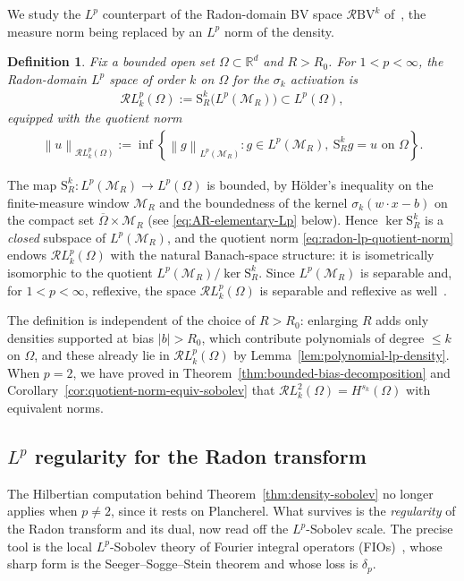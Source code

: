 \documentclass[12pt]{article}
\numberwithin{equation}{section}
\newtheorem{definition}{Definition}[section]
\numberwithin{figure}{section}
\numberwithin{equation}{section}
\newcommand{\R}{\mathbb{R}}
\newcommand{\MR}{\mathcal M_R}
\newcommand{\norm}[1]{\left\|#1\right\|}
\begin{document}
We study the $L^p$ counterpart of the Radon-domain
BV space $\mathcal{R}\mathrm{BV}^k$
of~\cite{parhi_banachspacerepresenter_2021,parhi_whatkindsfunctions_2022}, the
measure norm being replaced by an $L^p$ norm of the density.
\begin{definition}
\label{def:radon-lp-representation-space}
Fix a bounded open set $\Omega\subset\R^d$ and
$R>R_0$.  For $1<p<\infty$, the \emph{Radon-domain $L^p$
space of order $k$} on $\Omega$ for the $\sigma_k$ activation is
\begin{align*}
    \mathcal{R}L^p_k(\Omega)
    :=\mathrm{S}^k_R\bigl(L^p(\MR)\bigr)\subset L^p(\Omega),
\end{align*}
equipped with the quotient norm
\begin{align}
    \norm{u}_{\mathcal{R}L^p_k(\Omega)}
    :=\inf\left\{
    \norm{g}_{L^p(\MR)}:
    g\in L^p(\MR),\ \mathrm{S}^k_R g=u\text{ on }\Omega
    \right\}.
    \label{eq:radon-lp-quotient-norm}
\end{align}
\end{definition}
The map $\mathrm{S}^k_R:L^p(\MR)\to L^p(\Omega)$ is bounded, by H\"older's
inequality on the finite-measure window $\MR$ and the boundedness of the kernel
$\sigma_k(w\cdot x-b)$ on the compact set $\overline\Omega\times\MR$
(see \eqref{eq:AR-elementary-Lp} below).  Hence $\ker\mathrm{S}^k_R$ is a
\emph{closed} subspace of $L^p(\MR)$, and the quotient norm
\eqref{eq:radon-lp-quotient-norm} endows $\mathcal{R}L^p_k(\Omega)$ with the
natural Banach-space structure: it is isometrically isomorphic to the quotient
$L^p(\MR)/\ker\mathrm{S}^k_R$.  Since $L^p(\MR)$ is separable and, for
$1<p<\infty$, reflexive, the space $\mathcal{R}L^p_k(\Omega)$ is separable and
reflexive as well~\cite{lax2014functional}.

The definition is independent of the choice of $R>R_0$: enlarging $R$ adds only
densities supported at bias $|b|>R_0$, which contribute polynomials of degree
$\le k$ on $\Omega$, and these already lie in $\mathcal{R}L^p_k(\Omega)$ by
Lemma~\ref{lem:polynomial-lp-density}.  When $p=2$, we have proved in
Theorem~\ref{thm:bounded-bias-decomposition} and
Corollary~\ref{cor:quotient-norm-equiv-sobolev} that
$\mathcal{R}L^2_k(\Omega)=H^{s_k}(\Omega)$ with equivalent norms.

\subsection{\texorpdfstring{$L^p$}{Lp} regularity for the Radon transform}
The Hilbertian computation behind Theorem~\ref{thm:density-sobolev} no longer
applies when $p\neq2$, since it rests on Plancherel. What survives is the
\emph{regularity} of the Radon transform and its dual, now read off the
$L^p$-Sobolev scale. The precise tool is the local $L^p$-Sobolev theory of Fourier
integral operators
(FIOs)~\cite{hormander_LagrangianDistributionsFourier_2009,%
sogge_FourierIntegralsClassical_2017,stein_harmonicanalysis_1993}, whose sharp form
is the Seeger--Sogge--Stein theorem and whose loss is $\delta_p$.
\end{document}
